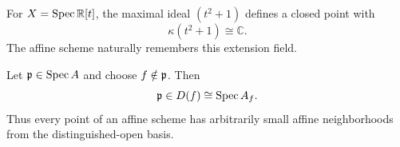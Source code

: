 \begin{example}
For $X=\operatorname{Spec}\mathbb R[t]$, the maximal ideal $(t^2+1)$ defines a closed point with
\[
\kappa(t^2+1)\cong\mathbb C.
\]
The affine scheme naturally remembers this extension field.
\end{example}

\begin{example}
Let $\mathfrak p\in\operatorname{Spec} A$ and choose $f\notin\mathfrak p$.  Then
\[
\mathfrak p\in D(f)\cong\operatorname{Spec} A_f.
\]
Thus every point of an affine scheme has arbitrarily small affine neighborhoods from the
distinguished-open basis.
\end{example}
